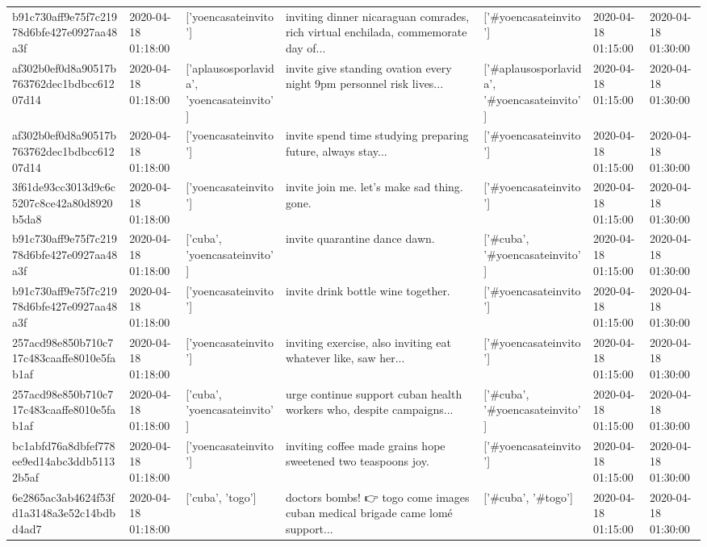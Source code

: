 \begin{tabular}{lllllll}
b91c730aff9e75f7c21978d6bfe427e0927aa48a3f & 2020-04-18 01:18:00 & ['yoencasateinvito'] & inviting dinner nicaraguan comrades, rich virtual enchilada, commemorate day of... & ['#yoencasateinvito'] & 2020-04-18 01:15:00 & 2020-04-18 01:30:00 \\
af302b0ef0d8a90517b763762dec1bdbcc61207d14 & 2020-04-18 01:18:00 & ['aplausosporlavida', 'yoencasateinvito'] & invite give standing ovation every night 9pm personnel risk lives... & ['#aplausosporlavida', '#yoencasateinvito'] & 2020-04-18 01:15:00 & 2020-04-18 01:30:00 \\
af302b0ef0d8a90517b763762dec1bdbcc61207d14 & 2020-04-18 01:18:00 & ['yoencasateinvito'] & invite spend time studying preparing future, always stay... & ['#yoencasateinvito'] & 2020-04-18 01:15:00 & 2020-04-18 01:30:00 \\
3f61de93cc3013d9c6c5207c8ce42a80d8920b5da8 & 2020-04-18 01:18:00 & ['yoencasateinvito'] & invite join me. let's make sad thing. gone. & ['#yoencasateinvito'] & 2020-04-18 01:15:00 & 2020-04-18 01:30:00 \\
b91c730aff9e75f7c21978d6bfe427e0927aa48a3f & 2020-04-18 01:18:00 & ['cuba', 'yoencasateinvito'] & invite quarantine dance dawn. & ['#cuba', '#yoencasateinvito'] & 2020-04-18 01:15:00 & 2020-04-18 01:30:00 \\
b91c730aff9e75f7c21978d6bfe427e0927aa48a3f & 2020-04-18 01:18:00 & ['yoencasateinvito'] & invite drink bottle wine together. & ['#yoencasateinvito'] & 2020-04-18 01:15:00 & 2020-04-18 01:30:00 \\
257acd98e850b710c717c483caaffe8010e5fab1af & 2020-04-18 01:18:00 & ['yoencasateinvito'] & inviting exercise, also inviting eat whatever like, saw her... & ['#yoencasateinvito'] & 2020-04-18 01:15:00 & 2020-04-18 01:30:00 \\
257acd98e850b710c717c483caaffe8010e5fab1af & 2020-04-18 01:18:00 & ['cuba', 'yoencasateinvito'] & urge continue support cuban health workers who, despite campaigns... & ['#cuba', '#yoencasateinvito'] & 2020-04-18 01:15:00 & 2020-04-18 01:30:00 \\
bc1abfd76a8dbfef778ee9ed14abc3ddb51132b5af & 2020-04-18 01:18:00 & ['yoencasateinvito'] & inviting coffee made grains hope sweetened two teaspoons joy. & ['#yoencasateinvito'] & 2020-04-18 01:15:00 & 2020-04-18 01:30:00 \\
6e2865ac3ab4624f53fd1a3148a3e52c14bdbd4ad7 & 2020-04-18 01:18:00 & ['cuba', 'togo'] & doctors bombs! 👉 togo come images cuban medical brigade came lomé support... & ['#cuba', '#togo'] & 2020-04-18 01:15:00 & 2020-04-18 01:30:00 \\

\end{tabular}
